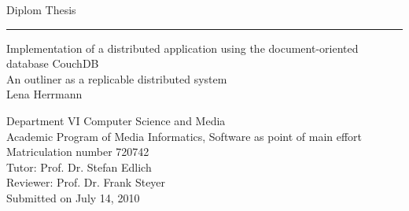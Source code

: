 %
%
%
%


\begin{titlepage}
\begin{spacing}{1}

\begin{flushright}
  \Large{\textsf{Diplom Thesis}}
\end{flushright}
\vspace{1em}


\hrule height 1.5pt depth 0.0pt 
\vspace{0.2em}

\begin{flushleft}
  
  \Huge{\textsf{Implementation of a distributed application using the document-oriented database CouchDB\\}}
  \vspace{0.4em}
  \Large{\textsf{An outliner as a replicable distributed system\\}}
  \vspace{1.7em}
  \Large{\textsf{Lena Herrmann}}

  \vspace{8.3em}

  \begin{figure}[!ht]
    \quad\quad
  \end{figure}


  \vspace{1.5em}

  \normalsize{\textsf{Department VI Computer Science and Media\\
    Academic Program of Media Informatics, Software as point of main effort\\
    Matriculation number 720742\\
    \vspace{0.9em}
    Tutor: Prof. Dr. Stefan Edlich\\
		Reviewer: Prof. Dr. Frank Steyer\\
		\vspace{0.9em}
		Submitted on July 14, 2010
  }}
\end{flushleft}


\end{spacing}
\end{titlepage}
